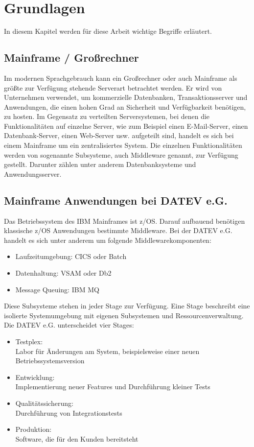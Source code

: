 \chapter{Grundlagen}\label{ch:grundlagen}
In diesem Kapitel werden für diese Arbeit wichtige Begriffe erläutert.

\section{Mainframe / Großrechner}\label{sec:mainframe}
Im modernen Sprachgebrauch kann ein Großrechner oder auch Mainframe als größte zur Verfügung stehende Serverart betrachtet werden.
Er wird von Unternehmen verwendet, um  kommerzielle Datenbanken, Transaktionsserver und Anwendungen, die einen hohen Grad an Sicherheit und Verfügbarkeit benötigen, zu hosten.
Im Gegensatz zu verteilten Serversystemen, bei denen die Funktionalitäten auf einzelne Server, wie zum Beispiel einen E-Mail-Server, einen Datenbank-Server, einen Web-Server usw. aufgeteilt sind, handelt es sich bei einem Mainframe um ein zentralisiertes System.
Die einzelnen Funktionalitäten werden von sogenannte \glqq Subsysteme\grqq, auch \glqq Middleware\grqq{} genannt, zur Verfügung gestellt.
Darunter zählen unter anderem Datenbanksysteme und Anwendungsserver.
\cite{Ebbers.2011}

\section{Mainframe Anwendungen bei DATEV e.G.}
Das Betriebssystem des IBM Mainframes ist z/OS.
Darauf aufbauend benötigen klassische z/OS Anwendungen bestimmte Middleware.
Bei der DATEV e.G. handelt es sich unter anderem um folgende Middlewarekomponenten:

\begin{itemize}
\item Laufzeitumgebung: CICS oder Batch
\item Datenhaltung: VSAM oder Db2
\item Message Queuing: IBM MQ
\end{itemize}

Diese Subsysteme stehen in jeder Stage zur Verfügung.
Eine Stage beschreibt eine isolierte Systemumgebung mit eigenen Subsystemen und Ressourcenverwaltung.
Die DATEV e.G. unterscheidet vier Stages:
\begin{samepage}
\begin{itemize}
\item Testplex:\\
Labor für Änderungen am System, beispielsweise einer neuen Betriebssystemsversion
\item Entwicklung:\\
Implementierung neuer Features und Durchführung kleiner Tests
\item Qualitätssicherung:\\
Durchführung von Integrationstests
\item Produktion:\\
Software, die für den Kunden bereitsteht
\end{itemize}
\end{samepage}

